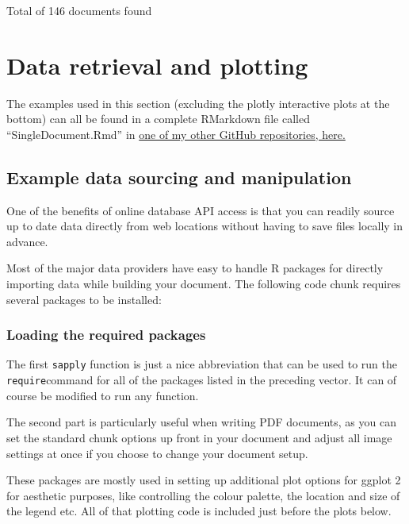 \documentclass[
]{book}
\begin{document}
Total of 146 documents found

\hypertarget{data-retrieval-and-plotting}{%
\chapter{Data retrieval and plotting}\label{data-retrieval-and-plotting}}

The examples used in this section (excluding the plotly interactive plots at the bottom) can all be found in a complete RMarkdown file called ``SingleDocument.Rmd'' in \href{https://github.com/robabsmith/Rmarkdown-project-template}{one of my other GitHub repositories, here.}

\hypertarget{example-data-sourcing-and-manipulation}{%
\section{Example data sourcing and manipulation}\label{example-data-sourcing-and-manipulation}}

One of the benefits of online database API access is that you can readily source up to date data directly from web locations without having to save files locally in advance.

Most of the major data providers have easy to handle R packages for directly importing data while building your document. The following code chunk requires several packages to be installed:

\hypertarget{loading-the-required-packages}{%
\subsection{Loading the required packages}\label{loading-the-required-packages}}

The first \texttt{sapply} function is just a nice abbreviation that can be used to run the \texttt{require}command for all of the packages listed in the preceding vector. It can of course be modified to run any function.

The second part is particularly useful when writing PDF documents, as you can set the standard chunk options up front in your document and adjust all image settings at once if you choose to change your document setup.

These packages are mostly used in setting up additional plot options for ggplot 2 for aesthetic purposes, like controlling the colour palette, the location and size of the legend etc. All of that plotting code is included just before the plots below.
\end{document}
